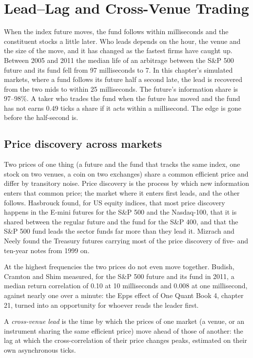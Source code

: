 \chapter{Lead--Lag and Cross-Venue Trading}\label{ch:hf:lead-lag-and-cross-venue-trading}

When the index future moves, the fund follows within milliseconds and the constituent stocks a little later. Who leads depends on the hour, the
venue and the size of the move, and it has changed as the fastest firms have caught up. Between 2005 and 2011 the median life of an arbitrage between
the S\&P 500 future and its fund fell from 97 milliseconds to 7. In this chapter's simulated markets, where a fund follows its future half a second
late, the lead is recovered from the two mids to within 25 milliseconds. The future's information share is 97--98\%. A taker who trades the fund when
the future has moved and the fund has not earns 0.49 ticks a share if it acts within a millisecond. The edge is gone before the half-second is.

\section{Price discovery across markets}

Two prices of one thing (a future and the fund that tracks the same index, one stock on two venues, a coin on two exchanges) share a common
efficient price and differ by transitory noise. Price discovery is the process by which new information enters that common price; the market where it
enters first leads, and the other follows. Hasbrouck found, for US equity indices, that most price discovery happens in the E-mini futures for the S\&P
500 and the Nasdaq-100, that it is shared between the regular future and the fund for the S\&P 400, and that the S\&P 500 fund leads the sector funds
far more than they lead it. Mizrach and Neely found the Treasury futures carrying most of the price discovery of five- and ten-year notes from 1999 on.

At the highest frequencies the two prices do not even move together. Budish, Cramton and Shim measured, for the S\&P 500 future and its fund in 2011,
a median return correlation of 0.10 at 10 milliseconds and 0.008 at one millisecond, against nearly one over a minute: the Epps effect of One Quant
Book 4, chapter 21, turned into an opportunity for whoever reads the leader first.

\begin{definition}\label{def:hf:lead-lag-and-cross-venue-trading:lead}
A \emph{cross-venue lead} is the time by which the prices of one market (a venue, or an instrument sharing the same
efficient price) move ahead of those of another: the lag at which the cross-correlation of their price changes peaks, estimated on their own
asynchronous ticks.
\end{definition}


